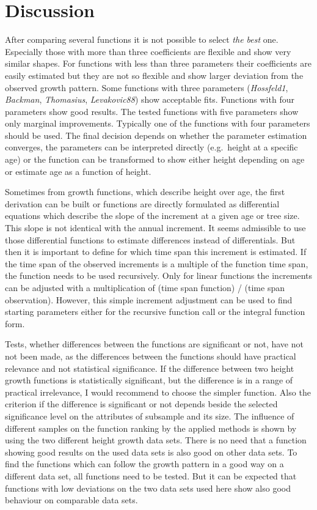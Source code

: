 \documentclass[a4paper,twocolumn]{article}
\begin{document}


\section{Discussion}

After comparing several functions it is not possible to select
\emph{the best} one. Especially those with more than three coefficients
are flexible and show very similar shapes. For functions with less
than three parameters their coefficients are easily estimated but they
are not so flexible and show larger deviation from the observed growth
pattern. Some functions with three parameters (\emph{Hossfeld1},
\emph{Backman}, \emph{Thomasius}, \emph{Levakovic88}) show acceptable
fits. Functions with four parameters show good results. The tested
functions with five parameters show only marginal
improvements. Typically one of the functions with four parameters should
be used. The final decision depends on whether the parameter
estimation converges, the parameters can be interpreted directly
(e.g.\ height at a specific age) or the function can be transformed to
show either height depending on age or estimate age as a function of
height.

Sometimes from growth functions, which describe height over age, the
first derivation can be built or functions are directly formulated as
differential equations which describe the slope of the increment at a
given age or tree size. This slope is not identical with the annual
increment. It seems admissible to use those differential functions to
estimate differences instead of differentials. But then it is
important to define for which time span this increment is estimated.
If the time span of the observed increments is a multiple of the
function time span, the function needs to be used recursively. Only
for linear functions the increments can be adjusted with a
multiplication of (time span function) / (time span observation).
However, this simple increment adjustment can be used to find starting
parameters either for the recursive function call or the integral
function form.

Tests, whether differences between the functions are significant or
not, have not not been made, as the differences between the functions
should have practical relevance and not statistical significance. If
the difference between two height growth functions is statistically
significant, but the difference is in a range of practical
irrelevance, I would recommend to choose the simpler function. Also
the criterion if the difference is significant or not depends beside
the selected significance level on the attributes of subsample and
its size. The influence of different samples on the function ranking
by the applied methods is shown by using the two different height
growth data sets. There is no need that a function showing good
results on the used data sets is also good on other data sets. To find
the functions which can follow the growth pattern in a good way on a
different data set, all functions need to be tested. But it can
be expected that functions with low deviations on the two
data sets used here show also good behaviour on comparable data sets.
\end{document}
